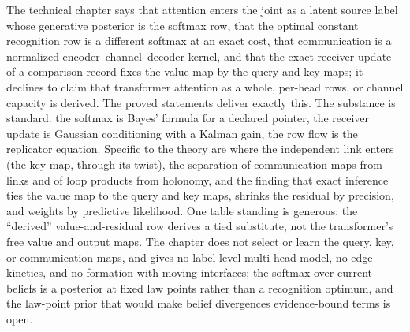 \begin{verdictbox}{\DELIVERED}
The technical chapter says that attention enters the joint as a latent source label whose generative posterior is the
softmax row, that the optimal constant recognition row is a different softmax at an exact cost, that communication is a
normalized encoder--channel--decoder kernel, and that the exact receiver update of a comparison record fixes the value map
by the query and key maps; it declines to claim that transformer attention as a whole, per-head rows, or channel capacity is
derived. The proved statements deliver exactly this. The substance is standard: the softmax is Bayes' formula for a declared
pointer, the receiver update is Gaussian conditioning with a Kalman gain, the row flow is the replicator equation. Specific
to the theory are where the independent link enters (the key map, through its twist), the separation of communication maps
from links and of loop products from holonomy, and the finding that exact inference ties the value map to the query and key
maps, shrinks the residual by precision, and weights by predictive likelihood. One table standing is generous: the
``derived'' value-and-residual row derives a tied substitute, not the transformer's free value and output maps. The chapter
does not select or learn the query, key, or communication maps, and gives no label-level multi-head model, no edge kinetics,
and no formation with moving interfaces; the softmax over current beliefs is a posterior at fixed law points rather than a
recognition optimum, and the law-point prior that would make belief divergences evidence-bound terms is open.
\end{verdictbox}
